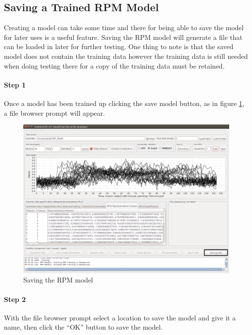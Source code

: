 \documentclass[letterpaper, 12pt]{article}
\begin{document}
\subsection{Saving a Trained RPM Model}
\label{RPMSaving}
Creating a model can take some time and there for being able to save the model for later uses is a useful feature. Saving the RPM model will generate a file that can be loaded in later for further testing. One thing to note is that the saved model does not contain the training data however the training data is still needed when doing testing there for a copy of the training data must be retained.

\paragraph{Step 1}
Once a model has been trained up clicking the save model button, as in figure \ref{fig:TSAT-save-model-step-1}, a file browser prompt will appear.

\begin{figure}[H]
	\includegraphics[width=\textwidth]{TSAT-save-model-step-1}
	\caption{Saving the RPM model}
	\label{fig:TSAT-save-model-step-1}
\end{figure}

\newpage
\paragraph{Step 2}
With the file browser prompt select a location to save the model and give it a name, then click the ``OK'' button to save the model.
\end{document}
